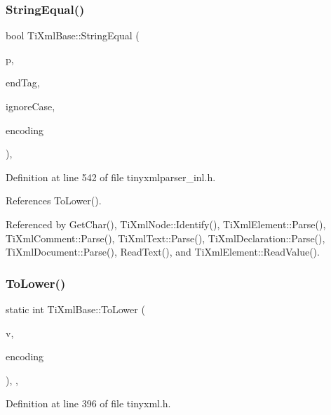 \subsubsection{\texorpdfstring{String\+Equal()}{StringEqual()}}
{\footnotesize\ttfamily bool Ti\+Xml\+Base\+::\+String\+Equal (\begin{DoxyParamCaption}\item[{const char $\ast$}]{p,  }\item[{const char $\ast$}]{end\+Tag,  }\item[{bool}]{ignore\+Case,  }\item[{\hyperlink{tinyxml_8h_a88d51847a13ee0f4b4d320d03d2c4d96}{Ti\+Xml\+Encoding}}]{encoding }\end{DoxyParamCaption})\hspace{0.3cm}{\ttfamily [static]}, {\ttfamily [protected]}}



Definition at line 542 of file tinyxmlparser\+\_\+inl.\+h.



References To\+Lower().



Referenced by Get\+Char(), Ti\+Xml\+Node\+::\+Identify(), Ti\+Xml\+Element\+::\+Parse(), Ti\+Xml\+Comment\+::\+Parse(), Ti\+Xml\+Text\+::\+Parse(), Ti\+Xml\+Declaration\+::\+Parse(), Ti\+Xml\+Document\+::\+Parse(), Read\+Text(), and Ti\+Xml\+Element\+::\+Read\+Value().

\hypertarget{class_ti_xml_base_a799f17405a86a5c2029618e85f11a097}{}\label{class_ti_xml_base_a799f17405a86a5c2029618e85f11a097} 
\subsubsection{\texorpdfstring{To\+Lower()}{ToLower()}}
{\footnotesize\ttfamily static int Ti\+Xml\+Base\+::\+To\+Lower (\begin{DoxyParamCaption}\item[{int}]{v,  }\item[{\hyperlink{tinyxml_8h_a88d51847a13ee0f4b4d320d03d2c4d96}{Ti\+Xml\+Encoding}}]{encoding }\end{DoxyParamCaption})\hspace{0.3cm}{\ttfamily [inline]}, {\ttfamily [static]}, {\ttfamily [protected]}}



Definition at line 396 of file tinyxml.\+h.



